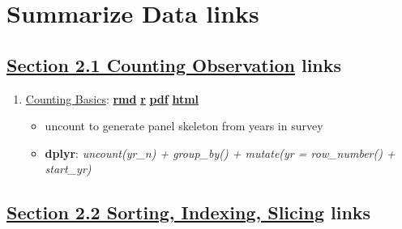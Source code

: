 \documentclass[
]{book}
\providecommand{\tightlist}{%
  \setlength{\itemsep}{0pt}\setlength{\parskip}{0pt}}
\begin{document}
\hypertarget{summarize-data-links}{%
\section{Summarize Data links}\label{summarize-data-links}}

\hypertarget{section-2.1-counting-observationcounting-observation-links}{%
\subsection{\texorpdfstring{\protect\hyperlink{counting-observation}{Section 2.1 Counting Observation} links}{Section 2.1 Counting Observation links}}\label{section-2.1-counting-observationcounting-observation-links}}

\begin{enumerate}
\def\labelenumi{\arabic{enumi}.}
\tightlist
\item
  \href{https://fanwangecon.github.io/R4Econ/summarize/count/htmlpdfr/fs_count_basics.html}{Counting Basics}: \href{https://github.com/FanWangEcon/R4Econ/blob/master/summarize/count//fs_count_basics.Rmd}{\textbf{rmd}} \textbar{} \href{https://github.com/FanWangEcon/R4Econ/blob/master/summarize/count/htmlpdfr/fs_count_basics.R}{\textbf{r}} \textbar{} \href{https://github.com/FanWangEcon/R4Econ/blob/master/summarize/count/htmlpdfr/fs_count_basics.pdf}{\textbf{pdf}} \textbar{} \href{https://fanwangecon.github.io/R4Econ/summarize/count/htmlpdfr/fs_count_basics.html}{\textbf{html}}

  \begin{itemize}
  \tightlist
  \item
    uncount to generate panel skeleton from years in survey
  \item
    \textbf{dplyr}: \emph{uncount(yr\_n) + group\_by() + mutate(yr = row\_number() + start\_yr)}
  \end{itemize}
\end{enumerate}

\hypertarget{section-2.2-sorting-indexing-slicingsorting-indexing-slicing-links}{%
\subsection{\texorpdfstring{\protect\hyperlink{sorting-indexing-slicing}{Section 2.2 Sorting, Indexing, Slicing} links}{Section 2.2 Sorting, Indexing, Slicing links}}\label{section-2.2-sorting-indexing-slicingsorting-indexing-slicing-links}}
\end{document}
